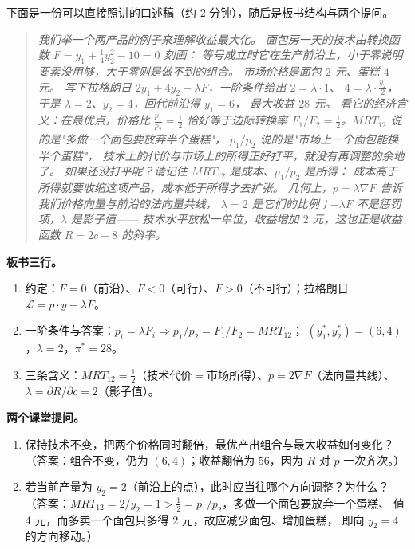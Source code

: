 下面是一份可以直接照讲的口述稿（约 $2$ 分钟），随后是板书结构与两个提问。

\begin{quote}
\small
\textsl{我们举一个两产品的例子来理解收益最大化。
面包房一天的技术由转换函数 $F=y_1+\frac14 y_2^{2}-10=0$ 刻画：
等号成立时它在生产前沿上，小于零说明要素没用够，大于零则是做不到的组合。
市场价格是面包 $2$ 元、蛋糕 $4$ 元。
写下拉格朗日 $2y_1+4y_2-\lambda F$，一阶条件给出 $2=\lambda\cdot 1$、
$4=\lambda\cdot \frac{y_2}{2}$，于是 $\lambda=2$、$y_2=4$，回代前沿得 $y_1=6$，
最大收益 $28$ 元。
看它的经济含义：在最优点，价格比 $\frac{p_1}{p_2}=\frac12$ 恰好等于边际转换率
$F_1/F_2=\frac12$。$MRT_{12}$ 说的是"多做一个面包要放弃半个蛋糕"，
$p_1/p_2$ 说的是"市场上一个面包能换半个蛋糕"，
技术上的代价与市场上的所得正好打平，就没有再调整的余地了。
如果还没打平呢？请记住 $MRT_{12}$ 是成本、$p_1/p_2$ 是所得：
成本高于所得就要收缩这项产品，成本低于所得才去扩张。
几何上，$p=\lambda\nabla F$ 告诉我们价格向量与前沿的法向量共线，
$\lambda=2$ 是它们的比例；$-\lambda F$ 不是惩罚项，$\lambda$ 是影子值——
技术水平放松一单位，收益增加 $2$ 元，这也正是收益函数 $R=2c+8$ 的斜率。}
\end{quote}

\noindent\textbf{板书三行。}
\begin{enumerate}
  \item 约定：$F=0$（前沿）、$F<0$（可行）、$F>0$（不可行）；拉格朗日 $\mathcal{L}=p\cdot y-\lambda F$。
  \item 一阶条件与答案：$p_i=\lambda F_i\Rightarrow p_1/p_2=F_1/F_2=MRT_{12}$；
        $(y_1^{*},y_2^{*})=(6,4)$，$\lambda=2$，$\pi^{*}=28$。
  \item 三条含义：$MRT_{12}=\frac12$（技术代价$=$市场所得）、$p=2\nabla F$（法向量共线）、
        $\lambda=\partial R/\partial c=2$（影子值）。
\end{enumerate}

\noindent\textbf{两个课堂提问。}
\begin{enumerate}
  \item 保持技术不变，把两个价格同时翻倍，最优产出组合与最大收益如何变化？
        （答案：组合不变，仍为 $(6,4)$；收益翻倍为 $56$，因为 $R$ 对 $p$ 一次齐次。）
  \item 若当前产量为 $y_2=2$（前沿上的点），此时应当往哪个方向调整？为什么？
        （答案：$MRT_{12}=2/y_2=1>\frac12=p_1/p_2$，多做一个面包要放弃一个蛋糕、
        值 $4$ 元，而多卖一个面包只多得 $2$ 元，故应减少面包、增加蛋糕，
        即向 $y_2=4$ 的方向移动。）
\end{enumerate}

